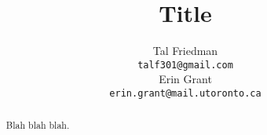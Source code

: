 \documentclass{article} %
\title{Title}
\author{
Tal Friedman \\
\texttt{talf301@gmail.com} \\
\And
Erin Grant \\
\texttt{erin.grant@mail.utoronto.ca}
}
\begin{document}
\nobibliography*

\maketitle


\begin{abstract}

    Blah blah blah.

\end{abstract}












\newpage

\newpage


\newpage


\end{document}
